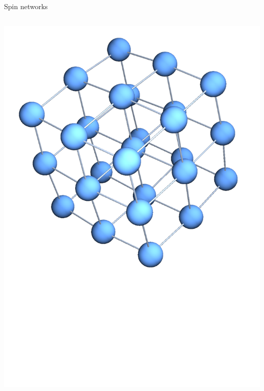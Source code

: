 {\begin{frame}[t]{Spin networks}
\begin{columns}[T]
\begin{column}{0.33\textwidth}
    		\includegraphics[trim=0 0 0 -10mm, width=\textwidth]{Images/chain3_cubic}\\

\end{column}
\end{columns}
\end{frame}}
